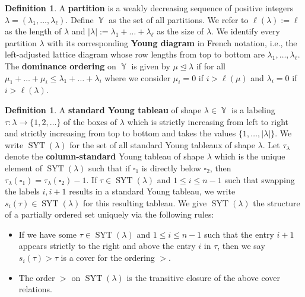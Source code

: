 \documentclass[12pt,reqno]{amsart}
\theoremstyle{definition}
\newtheorem{defn}[thm]{Definition}
\DeclareMathOperator{\SYT}{\mathrm{SYT}}
\DeclareMathOperator{\Par}{\mathbb{Y}}
\begin{document}
\begin{defn}\label{defn partitions}
    A \textbf{partition} is a weakly decreasing sequence of positive integers $\lambda = (\lambda_1,\dots,\lambda_{\ell})$. Define $\Par$ as the set of all partitions. We refer to $\ell(\lambda):= \ell$ as the length of $\lambda$ and $|\lambda|:= \lambda_1+\dots + \lambda_{\ell}$ as the size of $\lambda.$ We identify every partition $\lambda$ with its corresponding \textbf{Young diagram} in French notation, i.e., the left-adjusted lattice diagram whose row lengths from top to bottom are $\lambda_1,\dots,\lambda_{\ell}.$ The \textbf{dominance ordering} on $\Par$ is given by $\mu \trianglelefteq \lambda$ if for all $\mu_1+\dots+\mu_i \leq \lambda_1+\dots + \lambda_i$ where we consider $\mu_i = 0$ if $i > \ell(\mu)$ and $\lambda_i = 0$ if $i > \ell(\lambda).$
\end{defn}

\begin{defn}\label{defn Young diagrams}
     A \textbf{standard Young tableau} of shape $\lambda \in \Par$ is a labeling $\tau: \lambda \rightarrow \{1,2,\dots\}$ of the boxes of $\lambda$ which is strictly increasing from left to right and strictly increasing from top to bottom and takes the values $\{1,\dots,|\lambda|\}.$ We write $\SYT(\lambda)$ for the set of all standard Young tableaux of shape $\lambda.$ Let $\tau_{\lambda}$ denote the \textbf{column-standard} Young tableau of shape $\lambda$ which is the unique element of $\SYT(\lambda)$ such that if $\square_1$ is directly below $\square_2$, then $\tau_{\lambda}(\square_1) = \tau_{\lambda}(\square_2) -1.$ If $\tau \in \SYT(\lambda)$ and $1\leq i \leq n-1$ such that swapping the labels $i,i+1$ results in a standard Young tableau, we write $s_i(\tau)\in \SYT(\lambda)$ for this resulting tableau. We give $\SYT(\lambda)$ the structure of a partially ordered set uniquely via the following rules:
    \begin{itemize}
        \item If we have some $\tau \in \SYT(\lambda)$ and $1\leq i \leq n-1$ such that the entry $i+1$ appears strictly to the right and above the entry $i$ in $\tau$, then we say $s_i(\tau) > \tau$ is a cover for the ordering $>.$
        \item The order $>$ on $\SYT(\lambda)$ is the transitive closure of the above cover relations. 
    \end{itemize}
\end{defn}
\end{document}
